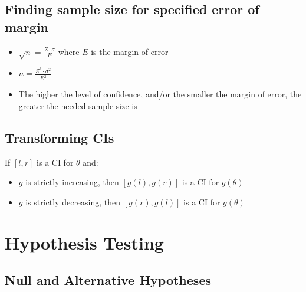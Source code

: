 \documentclass{article}
\begin{document}
\subsection{Finding sample size for specified error of margin}

\begin{itemize}
    \item $\sqrt{n}=\frac{Z \cdot \sigma}{E}$ where $E$ is the margin of error
    \item $n= \frac{Z^2 \cdot \sigma^2}{E^2}$
    \item The higher the level of confidence, and/or the smaller the margin of error, the greater the needed sample size is
\end{itemize}

\subsection{Transforming CIs}

If $[l,r]$ is a CI for $\theta$ and:
\begin{itemize}
    \item $g$ is strictly increasing, then $[g(l),g(r)]$ is a CI for $g(\theta)$
    \item $g$ is strictly decreasing, then $[g(r),g(l)]$ is a CI for $g(\theta)$
\end{itemize}

\section{Hypothesis Testing}

\subsection{Null and Alternative Hypotheses}
\end{document}
